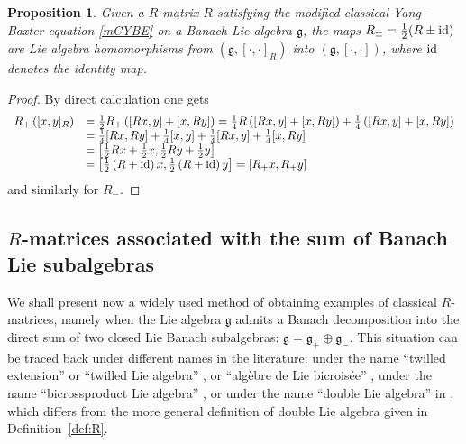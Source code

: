 \documentclass[a4paper,12pt,reqno]{amsart}%
\newtheorem{proposition}[theorem]{Proposition}
\theoremstyle{definition}
\theoremstyle{remark}
\numberwithin{theorem}{section}
\numberwithin{equation}{section}
\newcommand{\1}{{\bf 1}}
\newcommand{\id}{{\rm id}}
\begin{document}
\begin{proposition}\label{prop:Rpm}
Given a $R$-matrix $R$ satisfying the modified classical Yang--Baxter equation \eqref{mCYBE} on a Banach Lie algebra $\mathfrak{g}$, the maps $R_\pm = \frac{1}{2}(R\pm \id)$ are Lie algebra homomorphisms from $\left(\mathfrak{g}, [\cdot, \cdot]_R\right)$ into $\left(\mathfrak{g}, [\cdot, \cdot]\right)$, where $\id$ denotes the identity map.
\end{proposition}


\begin{proof}
By direct calculation one gets
\[
\begin{array}{ll}
R_+\left([x, y]_R\right) &=\frac{1}{2} R_+\left( [Rx, y] + [x, Ry]\right) = \frac{1}{4} R\left( [Rx, y] + [x, Ry]\right) + \frac{1}{4}\left( [Rx, y] + [x, Ry]\right)\\
& = \frac{1}{4}[Rx, Ry] +\frac{1}{4}[x, y] +\frac{1}{4}[Rx, y] + \frac{1}{4}[x, Ry]\\
& = \left[\frac{1}{2}Rx +\frac{1}{2}x, \frac{1}{2} Ry + \frac{1}{2} y\right]\\
& = \left[\frac{1}{2}\left(R + \id\right)x, \frac{1}{2}\left(R + \id\right)y\right] = \left[R_+ x, R_+ y\right]
\end{array}
\]
and similarly for $R_-$.
\end{proof}

\subsection{\texorpdfstring{$R$}{R}-matrices associated with the sum of Banach Lie subalgebras}
\hfill
We shall present now a widely used method of obtaining examples of classical $R$-matrices, namely when the Lie algebra $\mathfrak{g}$ admits a Banach decomposition into the direct sum of two closed Lie Banach subalgebras: $\mathfrak{g} = \mathfrak{g}_+\oplus\mathfrak{g}_-$. This situation can be traced back under different names in the literature: under the name ``twilled extension'' or ``twilled Lie algebra''  \cite{KS89, kosmann88}, or ``algèbre de Lie bicroisée'' \cite{aminou1988groupes}, under the name ``bicrossproduct Lie algebra'' \cite{majid1988}, or under the name ``double Lie algebra'' in \cite{lu-weinstein90}, which differs from the more general definition of double Lie algebra given in Definition~\ref{def:R}.
\end{document}
